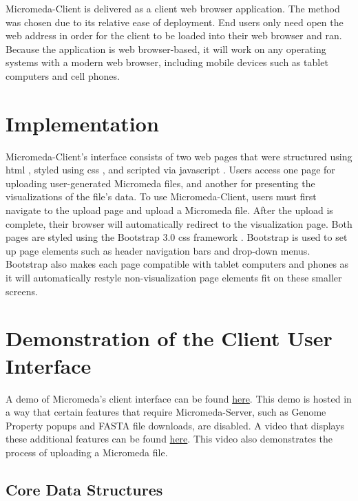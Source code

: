 Micromeda-Client is delivered as a client web browser application. The method 
was chosen due to its relative ease of deployment. End users only need open the 
web address in order for the client to be loaded into their web browser and ran. 
Because the application is web browser-based, it will work on any operating 
systems with a modern web browser, including mobile devices such as tablet 
computers and cell phones.

\section{Implementation} \label{client-implementation}

Micromeda-Client's interface consists of two web pages that were structured 
using \gls{html} \cite{HTML5}, styled using \gls{css} \cite{CSS3}, and scripted 
via \gls{javascript} \cite{flanagan2006javascript}. Users access one page for 
uploading user-generated Micromeda files, and another for presenting the 
visualizations of the file's data. To use Micromeda-Client, users must first 
navigate to the upload page and upload a Micromeda file. After the upload is 
complete, their browser will automatically redirect to the visualization page. 
Both pages are styled using the Bootstrap 3.0 \gls{css} framework 
\cite{spurlock2013bootstrap}. Bootstrap is used to set up page elements such as 
header navigation bars and drop-down menus. Bootstrap also makes each page 
compatible with tablet computers and phones as it will automatically restyle 
non-visualization page elements fit on these smaller screens.

\section{Demonstration of the Client User Interface} \label{client-demo}

A demo of Micromeda’s client interface can be found 
\href{http://tundra-pear.glitch.me}{here}. This demo is hosted in a way that 
certain features that require Micromeda-Server, such as Genome Property popups 
and FASTA file downloads, are disabled. A video that displays these additional 
features can be found 
\href{http://drive.google.com/file/d/1AhiiyCJcrLv_NqaTXSuxzuaZ8s0aCUtu/view?usp=sharing}{here}. 
This video also demonstrates the process of uploading a Micromeda file.

\subsection{Core Data Structures} \label{visual-data-structures}

